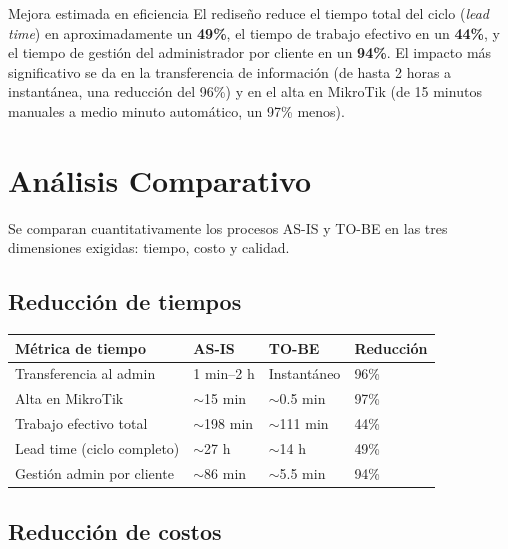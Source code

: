 \begin{upeubox}{Mejora estimada en eficiencia}
El rediseño reduce el tiempo total del ciclo (\textit{lead time}) en aproximadamente
un \textbf{49\%}, el tiempo de trabajo efectivo en un \textbf{44\%}, y el tiempo de
gestión del administrador por cliente en un \textbf{94\%}. El impacto más
significativo se da en la transferencia de información (de hasta 2 horas a
instantánea, una reducción del 96\%) y en el alta en MikroTik (de 15 minutos manuales
a medio minuto automático, un 97\% menos).
\end{upeubox}

\section{Análisis Comparativo}
\label{sec:comparativo}

Se comparan cuantitativamente los procesos AS-IS y TO-BE en las tres dimensiones
exigidas: tiempo, costo y calidad.

\subsection{Reducción de tiempos}

\begin{center}
\label{tab:comp-tiempos}
\begin{tabularx}{\textwidth}{L{3.8cm} X X C{1.9cm}}
\toprule
\textbf{Métrica de tiempo} & \textbf{AS-IS} & \textbf{TO-BE} & \textbf{Reducción} \\
\midrule
Transferencia al admin & 1 min--2 h & Instantáneo & 96\% \\
Alta en MikroTik & $\sim$15 min & $\sim$0.5 min & 97\% \\
Trabajo efectivo total & $\sim$198 min & $\sim$111 min & 44\% \\
Lead time (ciclo completo) & $\sim$27 h & $\sim$14 h & 49\% \\
Gestión admin por cliente & $\sim$86 min & $\sim$5.5 min & 94\% \\
\bottomrule
\end{tabularx}
\end{center}

\subsection{Reducción de costos}

